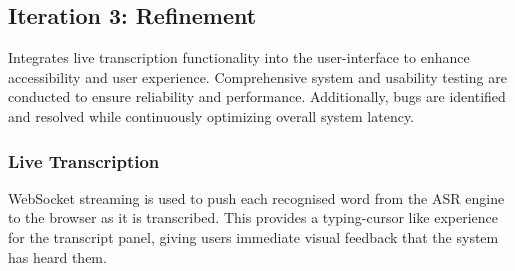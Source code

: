 \documentclass[12pt,a4paper]{report}
\begin{document}







\newpage
\subsection{Iteration 3: Refinement}

Integrates live transcription functionality into the user-interface to enhance accessibility and user experience. Comprehensive system and usability testing are conducted to ensure reliability and performance. Additionally, bugs are identified and resolved while continuously optimizing overall system latency.


\subsubsection{Live Transcription}

WebSocket streaming is used to push each recognised word from the ASR engine
to the browser as it is transcribed. This provides a typing-cursor like
experience for the transcript panel, giving users immediate visual feedback
that the system has heard them.
\end{document}
